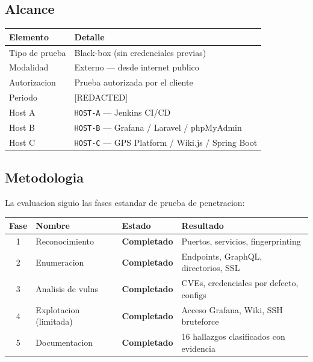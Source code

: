 \documentclass[11pt,a4paper]{article}
\begin{document}
\subsection{Alcance}

\begin{center}
\begin{tabularx}{\textwidth}{lX}
\toprule
\textbf{Elemento} & \textbf{Detalle} \\
\midrule
Tipo de prueba  & Black-box (sin credenciales previas) \\
Modalidad       & Externo --- desde internet publico \\
Autorizacion    & Prueba autorizada por el cliente \\
Periodo         & [REDACTED] \\
\midrule
Host A        & \texttt{HOST-A} --- Jenkins CI/CD \\
Host B        & \texttt{HOST-B} --- Grafana / Laravel / phpMyAdmin \\
Host C        & \texttt{HOST-C} --- GPS Platform / Wiki.js / Spring Boot \\
\bottomrule
\end{tabularx}
\end{center}

\subsection{Metodologia}

La evaluacion siguio las fases estandar de prueba de penetracion:

\begin{center}
\begin{tabular}{clll}
\toprule
\textbf{Fase} & \textbf{Nombre} & \textbf{Estado} & \textbf{Resultado} \\
\midrule
1 & Reconocimiento          & \textcolor{low}{\textbf{Completado}} & Puertos, servicios, fingerprinting \\
2 & Enumeracion             & \textcolor{low}{\textbf{Completado}} & Endpoints, GraphQL, directorios, SSL \\
3 & Analisis de vulns       & \textcolor{low}{\textbf{Completado}} & CVEs, credenciales por defecto, configs \\
4 & Explotacion (limitada)  & \textcolor{low}{\textbf{Completado}} & Acceso Grafana, Wiki, SSH bruteforce \\
5 & Documentacion           & \textcolor{low}{\textbf{Completado}} & 16 hallazgos clasificados con evidencia \\
\bottomrule
\end{tabular}
\end{center}
\end{document}
